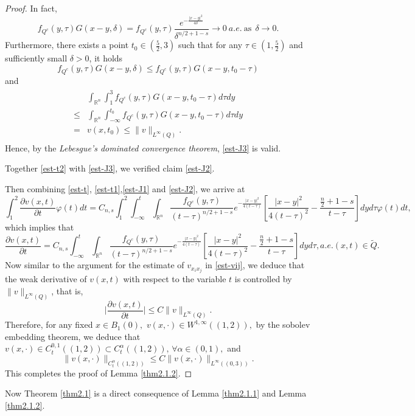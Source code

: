 \documentclass[12pt]{article}
\theoremstyle{remark}
\numberwithin{equation}{section}
\newcommand{\R}{\mathbb{R}}
\newcommand{\mb}{\mbox}
\begin{document}
\begin{proof}
In fact,
\[f_{Q^c}(y,\tau)G(x-y,\delta)=f_{Q^c}(y,\tau)\frac{e^{-\frac{|x-y|^2}{4\delta}}}{{\delta}^{n/2+1-s}}\to 0 \ a.e.\ \mb{as}\ \ \delta\to 0. \]
 Furthermore, there exists a point $t_0\in (\frac{5}{2},3)$ such that for any $\tau\in(1,\frac{5}{2})$ and sufficiently small $\delta>0$, it holds
 \[f_{Q^c}(y,\tau)G(x-y,\delta)\leq f_{Q^c}(y,\tau)G(x-y,t_0-\tau)\]
 and \begin{eqnarray*}
\begin{aligned}
&\int_{\R^n}\int_1^3f_{Q^c}(y,\tau)G(x-y,t_0-\tau)d\tau dy\\
\leq &\int_{\R^n}\int_{-\infty}^{t_0}f_{Q^c}(y,\tau)G(x-y,t_0-\tau)d\tau dy\\
=&v(x,t_0)\leq \|v\|_{L^{\infty}(Q)}.\end{aligned}
\end{eqnarray*}
Hence, by the {\em Lebesgue's dominated convergence theorem}, \eqref{est-J3} is valid.

Together \eqref{est-t2} with \eqref{est-J3}, we verified claim \eqref{est-J2}.

Then combining \eqref{est-t}, \eqref{est-t1},\eqref{est-J1} and \eqref{est-J2}, we arrive at
\[\int_1^2\frac{\partial v(x,t)}{\partial t}\varphi(t)dt=C_{n,s}\int_1^2\int_{-\infty}^{t}\int_{\R^n}\frac{f_{Q^c}(y,\tau)}{{(t-\tau)}^{n/2+1-s}} e^{-\frac{|x-y|^2}{4(t-\tau)}}\left[\frac{|x-y|^2}{4(t-\tau)^2}-\frac{\frac{n}{2}+1-s}{t-\tau}\right]dyd\tau\varphi(t)dt,\]
which implies that
\[\frac{\partial v(x,t)}{\partial t}=C_{n,s}\int_{-\infty}^{t}\int_{\R^n}\frac{f_{Q^c}(y,\tau)}{{(t-\tau)}^{n/2+1-s}} e^{-\frac{|x-y|^2}{4(t-\tau)}}\left[\frac{|x-y|^2}{4(t-\tau)^2}-\frac{\frac{n}{2}+1-s}{t-\tau}\right]dyd\tau, a.e. (x,t)\in \tilde{Q}.\]
Now similar to the argument for the estimate of $v_{x_ix_j}$ in \eqref{est-vij}, we deduce that the weak derivative of $v(x,t)$ with respect to the variable $t$ is controlled by $\|v\|_{L^{\infty}(Q)}$, that is,
\[\Bigg|\frac{\partial v(x,t)}{\partial t}\Bigg|\leq C\|v\|_{L^{\infty}(Q)}.\]
Therefore, for any fixed $x\in B_1(0),$ $v(x,\cdot)\in W^{1,\infty}((1,2)),$  by the sobolev  embedding theorem, we deduce that $v(x,\cdot)\in C_t^{0,1}((1,2))\subset C_t^{\alpha}((1,2)),  \, \forall \alpha\in(0, 1),$ and
\[\|v(x,\cdot)\|_{C_t^{\alpha}((1,2))}\leq C \|v(x,\cdot)\|_{L^{\infty}((0,3))}.\]
This completes the proof of Lemma \ref{thm2.1.2}. \end{proof}
\medskip

Now Theorem \ref{thm2.1} is a direct consequence of Lemma \ref{thm2.1.1} and Lemma \ref{thm2.1.2}.
\end{document}
